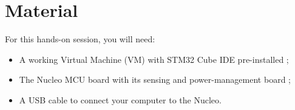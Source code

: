 \section*{Material}

\begin{comment}[couleur = gray!20, arrondi = 0.2, logo=\bcinfo]{}
\vspace{0.2cm}
\end{comment}
For this hands-on session, you will need:
\begin{itemize}
    \item A working Virtual Machine (VM) with STM32 Cube IDE pre-installed ;
    \item The Nucleo MCU board with its sensing and power-management board ;
    \item A USB cable to connect your computer to the Nucleo.
\end{itemize}
